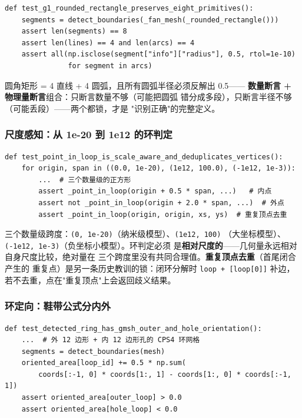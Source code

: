 \documentclass[12pt,a4paper]{ctexart}
\newcommand{\fem}{\Verb}
\begin{document}
\begin{lstlisting}
def test_g1_rounded_rectangle_preserves_eight_primitives():
    segments = detect_boundaries(_fan_mesh(_rounded_rectangle()))
    assert len(segments) == 8
    assert len(lines) == 4 and len(arcs) == 4
    assert all(np.isclose(segment["info"]["radius"], 0.5, rtol=1e-10)
               for segment in arcs)
\end{lstlisting}

圆角矩形 = 4 直线 + 4 圆弧，且所有圆弧半径必须反解出 0.5——
\textbf{数量断言 + 物理量断言}组合：只断言数量不够（可能把圆弧
错分成多段），只断言半径不够（可能丢段）——两个都锁，才是
"识别正确"的完整定义。

\subsubsection{尺度感知：从 1e-20 到 1e12 的环判定}

\begin{lstlisting}
def test_point_in_loop_is_scale_aware_and_deduplicates_vertices():
    for origin, span in ((0.0, 1e-20), (1e12, 100.0), (-1e12, 1e-3)):
        ...  # 三个数量级的正方形
        assert _point_in_loop(origin + 0.5 * span, ...)   # 内点
        assert not _point_in_loop(origin + 2.0 * span, ...)  # 外点
        assert _point_in_loop(origin, origin, xs, ys)  # 重复顶点去重
\end{lstlisting}

三个数量级跨度：\fem|(0, 1e-20)|（纳米级模型）、\fem|(1e12, 100)|
（大坐标模型）、\fem|(-1e12, 1e-3)|（负坐标小模型）。环判定必须
是\textbf{相对尺度的}——几何量永远相对自身尺度比较，绝对量在
三个跨度里没有共同合理值。\textbf{重复顶点去重}（首尾闭合产生的
重复点）是另一条历史教训的锁：闭环分解时 \fem|loop + [loop[0]]|
补边，若不去重，点在"重复顶点"上会返回歧义结果。

\subsubsection{环定向：鞋带公式分内外}

\begin{lstlisting}
def test_detected_ring_has_gmsh_outer_and_hole_orientation():
    ...  # 外 12 边形 + 内 12 边形孔的 CPS4 环网格
    segments = detect_boundaries(mesh)
    oriented_area[loop_id] += 0.5 * np.sum(
        coords[:-1, 0] * coords[1:, 1] - coords[1:, 0] * coords[:-1, 1])
    assert oriented_area[outer_loop] > 0.0
    assert oriented_area[hole_loop] < 0.0
\end{lstlisting}
\end{document}
